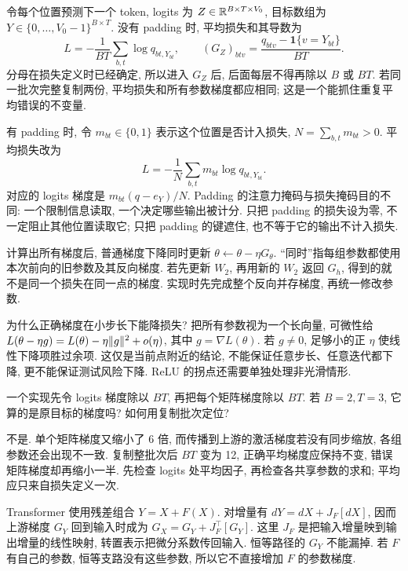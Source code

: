 令每个位置预测下一个 token, logits 为 $Z\in\mathbb R^{B\times T\times V_0}$, 目标数组为 $Y\in\{0,\ldots,V_0-1\}^{B\times T}$. 没有 padding 时, 平均损失和其导数为
\[
L=-\frac1{BT}\sum_{b,t}\log q_{bt,Y_{bt}},\qquad
(G_Z)_{btv}=\frac{q_{btv}-\mathbf1\{v=Y_{bt}\}}{BT}.
\]
分母在损失定义时已经确定, 所以进入 $G_Z$ 后, 后面每层不得再除以 $B$ 或 $BT$. 若同一批次完整复制两份, 平均损失和所有参数梯度都应相同; 这是一个能抓住重复平均错误的不变量.

有 padding 时, 令 $m_{bt}\in\{0,1\}$ 表示这个位置是否计入损失, $N=\sum_{b,t}m_{bt}>0$. 平均损失改为\[L=-\frac1N\sum_{b,t}m_{bt}\log q_{bt,Y_{bt}}.\]对应的 logits 梯度是 $m_{bt}(q-e_Y)/N$. Padding 的注意力掩码与损失掩码目的不同: 一个限制信息读取, 一个决定哪些输出被计分. 只把 padding 的损失设为零, 不一定阻止其他位置读取它; 只把 padding 的键遮住, 也不等于它的输出不计入损失.

计算出所有梯度后, 普通梯度下降同时更新 $\theta\leftarrow\theta-\eta G_\theta$. “同时”指每组参数都使用本次前向的旧参数及其反向梯度. 若先更新 $W_2$, 再用新的 $W_2$ 返回 $G_h$, 得到的就不是同一个损失在同一点的梯度. 实现时先完成整个反向并存梯度, 再统一修改参数.

为什么正确梯度在小步长下能降损失? 把所有参数视为一个长向量, 可微性给
$L(\theta-\eta g)=L(\theta)-\eta\lVert g\rVert^2+o(\eta)$, 其中 $g=\nabla L(\theta)$. 若 $g\ne0$, 足够小的正 $\eta$ 使线性下降项胜过余项. 这仅是当前点附近的结论, 不能保证任意步长、任意迭代都下降, 更不能保证测试风险下降. ReLU 的拐点还需要单独处理非光滑情形.

\begin{exercise}
一个实现先令 logits 梯度除以 $BT$, 再把每个矩阵梯度除以 $BT$. 若 $B=2,T=3$, 它算的是原目标的梯度吗? 如何用复制批次定位?
\end{exercise}
\begin{solution}
不是. 单个矩阵梯度又缩小了 6 倍, 而传播到上游的激活梯度若没有同步缩放, 各组参数还会出现不一致. 复制整批次后 $BT$ 变为 12, 正确平均梯度应保持不变, 错误矩阵梯度却再缩小一半. 先检查 logits 处平均因子, 再检查各共享参数的求和; 平均应只来自损失定义一次.
\end{solution}

Transformer 使用残差组合 $Y=X+F(X)$. 对增量有 $dY=dX+J_F[dX]$, 因而上游梯度 $G_Y$ 回到输入时成为 $G_X=G_Y+J_F^\top[G_Y]$. 这里 $J_F$ 是把输入增量映到输出增量的线性映射, 转置表示把微分系数传回输入. 恒等路径的 $G_Y$ 不能漏掉. 若 $F$ 有自己的参数, 恒等支路没有这些参数, 所以它不直接增加 $F$ 的参数梯度.

